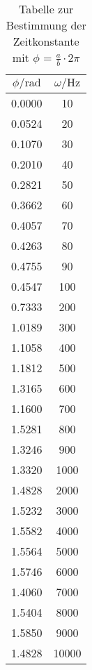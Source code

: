\begin{table}[H]
  \centering
  \caption{Tabelle zur Bestimmung der Zeitkonstante mit $\phi$ = $\frac{a}{b} \cdot 2\pi$}
    \begin{tabular}{c c}
      \toprule
      $\phi / \text{rad}$ & $\omega / \text{Hz}$  \\
      \midrule
       0.0000 &    10 \\
       0.0524 &    20 \\
       0.1070 &    30 \\
       0.2010 &    40 \\
       0.2821 &    50 \\
       0.3662 &    60 \\
       0.4057 &    70 \\
       0.4263 &    80 \\
       0.4755 &    90 \\
       0.4547 &    100 \\
       0.7333 &    200 \\
       1.0189 &    300 \\
       1.1058 &    400 \\
       1.1812 &    500 \\
       1.3165 &    600 \\
       1.1600 &    700 \\
       1.5281 &    800 \\
       1.3246 &    900 \\
       1.3320 &    1000 \\
       1.4828 &    2000 \\
       1.5232 &    3000 \\
       1.5582 &    4000 \\
       1.5564 &    5000 \\
       1.5746 &    6000 \\
       1.4060 &    7000 \\
       1.5404 &    8000 \\
       1.5850 &    9000 \\
       1.4828 &    10000 \\
      \bottomrule
    \end{tabular}
    \label{tab:3}
  \end{table}
